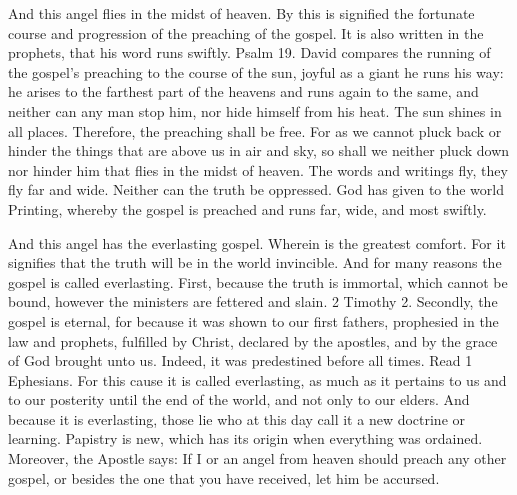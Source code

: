 And this angel flies in the midst of heaven. By this is signified the fortunate course and progression of the preaching of the gospel. It is also written in the prophets, that his word runs swiftly. Psalm 19. David compares the running of the gospel’s preaching to the course of the sun, joyful as a giant he runs his way: he arises to the farthest part of the heavens and runs again to the same, and neither can any man stop him, nor hide himself from his heat. The sun shines in all places. Therefore, the preaching shall be free. For as we cannot pluck back or hinder the things that are above us in air and sky, so shall we neither pluck down nor hinder him that flies in the midst of heaven. The words and writings fly, they fly far and wide. Neither can the truth be oppressed. God has given to the world Printing, whereby the gospel is preached and runs far, wide, and most swiftly.

And this angel has the everlasting gospel. Wherein is the greatest comfort. For it signifies that the truth will be in the world invincible. And for many reasons the gospel is called everlasting. First, because the truth is immortal, which cannot be bound, however the ministers are fettered and slain. 2 Timothy 2. Secondly, the gospel is eternal, for because it was shown to our first fathers, prophesied in the law and prophets, fulfilled by Christ, declared by the apostles, and by the grace of God brought unto us. Indeed, it was predestined before all times. Read 1 Ephesians. For this cause it is called everlasting, as much as it pertains to us and to our posterity until the end of the world, and not only to our elders. And because it is everlasting, those lie who at this day call it a new doctrine or learning. Papistry is new, which has its origin when everything was ordained. Moreover, the Apostle says: If I or an angel from heaven should preach any other gospel, or besides the one that you have received, let him be accursed.

